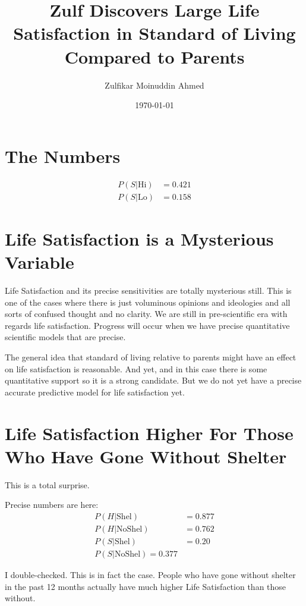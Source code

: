 \documentclass{amsart}
\title{Zulf Discovers Large Life Satisfaction in Standard of Living Compared to Parents}
\author{Zulfikar Moinuddin Ahmed}
\date{\today}
\begin{document}
\maketitle

\section{The Numbers}

\begin{align*}
P(S|\mathrm{Hi}) &= 0.421\\
P(S|\mathrm{Lo}) &= 0.158
\end{align*}

\section{Life Satisfaction is a Mysterious Variable}

Life Satisfaction and its precise sensitivities are totally mysterious still.  This is one of the cases where there is just voluminous opinions and ideologies and all sorts of confused thought and no clarity.  We are still in pre-scientific era with regards life satisfaction.  Progress will occur when we have precise quantitative scientific models that are precise.  

The general idea that standard of living relative to parents might have an effect on life satisfaction is reasonable.  And yet, and in this case there is some quantitative support so it is a strong candidate.  But we do not yet have a precise accurate predictive model for life satisfaction yet.


\section{Life Satisfaction Higher For Those Who Have Gone Without Shelter}

This is a total surprise.

Precise numbers are here:
\begin{align*}
P(H|\mathrm{Shel}) &= 0.877 \\
P(H|\mathrm{NoShel}) &= 0.762 \\
P( S | \mathrm{Shel} ) &= 0.20\\
P( S | \mathrm{NoShel} ) = 0.377
\end{align*}

I double-checked.  This is in fact the case.  People who have gone without shelter in the past 12 months actually have much higher Life Satisfaction than those without.
\end{document}
